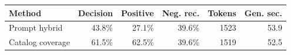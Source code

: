\begin{tabular}{lrrrrr}
\toprule
Method & Decision & Positive & Neg. rec. & Tokens & Gen. sec. \\
\midrule
Prompt hybrid & 43.8\% & 27.1\% & 39.6\% & 1523 & 53.9 \\
Catalog coverage & 61.5\% & 62.5\% & 39.6\% & 1519 & 52.5 \\
\bottomrule
\end{tabular}
